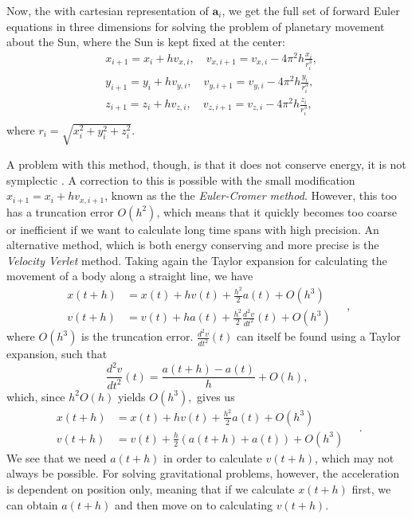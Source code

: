 \documentclass[]{article}
\begin{document}
Now, the with cartesian representation of $\mathbf{a}_i$, we get the full set of forward Euler equations in three dimensions for solving the problem of planetary movement about the Sun, where the Sun is kept fixed at the center:
\begin{equation} \label{euler-fwd}
\begin{aligned}
	&x_{i+1} = x_i + hv_{x,i} ,\quad v_{x,i+1} = v_{x,i} - 4\pi^2h\frac{x_i}{r_i^3} ,\\
	&y_{i+1} = y_i + hv_{y,i} ,\quad v_{y,i+1} = v_{y,i} - 4\pi^2h\frac{y_i}{r_i^3} ,\\
	&z_{i+1} = z_i + hv_{z,i} ,\quad v_{z,i+1} = v_{z,i} - 4\pi^2h\frac{z_i}{r_i^3} ,\\
\end{aligned}
\end{equation}
where $r_i = \sqrt{x_i^2 + y_i^2 + z_i^2}$.


A problem with this method, though, is that it does not conserve energy, it is not symplectic \cite{notes-10-02}. A correction to this is possible with the small modification $x_{i+1} = x_i + hv_{x,i+1}$, known as the the \textit{Euler-Cromer method}. However, this too has a truncation error $O(h^2)$, which means that it quickly becomes too coarse or inefficient if we want to calculate long time spans with high precision. An alternative method, which is both energy conserving and more precise is the \textit{Velocity Verlet} method. Taking again the Taylor expansion for calculating the movement of a body along a straight line, we have
\begin{equation}
\begin{aligned}
	x(t+h) &= x(t) + hv(t) + \frac{h^2}{2}a(t) + O(h^3) \\
	v(t+h) &= v(t) + ha(t) + \frac{h^2}{2}\frac{d^2v}{dt^2}(t) + O(h^3)
\end{aligned} \quad ,
\end{equation}
where $O(h^3)$ is the truncation error. $\frac{d^2v}{dt^2}(t)$ can itself be found using a Taylor expansion, such that
\begin{equation}
	\frac{d^2v}{dt^2}(t) = \frac{a(t+h) - a(t)}{h} + O(h),
\end{equation}
which, since $h^2O(h)$ yields $O(h^3)$, gives us 
\begin{equation}
\begin{aligned}
	x(t+h) &= x(t) + hv(t) + \frac{h^2}{2}a(t) + O(h^3) \\
	v(t+h) &= v(t) + \frac{h}{2}(a(t+h) + a(t)) + O(h^3)
\end{aligned} \quad .
\end{equation}
We see that we need $a(t+h)$ in order to calculate $v(t+h)$, which may not always be possible. For solving gravitational problems, however, the acceleration is dependent on position only, meaning that if we calculate $x(t+h)$ first, we can obtain $a(t+h)$ and then move on to calculating $v(t+h)$.
\end{document}
